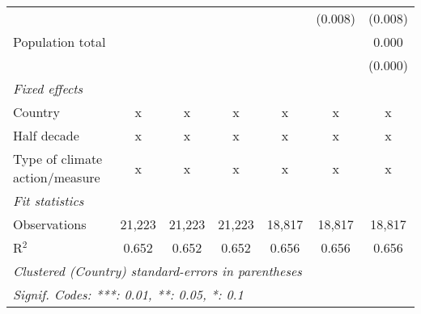 \begin{tabular}{lcccccc}
                                                             &         &                &                &               & (0.008)       & (0.008)\\   
   Population total                                          &         &                &                &               &               & 0.000\\   
                                                             &         &                &                &               &               & (0.000)\\   
   \emph{Fixed effects}\\
   Country                                                   & x       & x              & x              & x             & x             & x\\  
   Half decade                                               & x       & x              & x              & x             & x             & x\\  
   Type of climate action/measure                            & x       & x              & x              & x             & x             & x\\  
   \midrule \emph{Fit statistics}\\
   Observations                                              & 21,223  & 21,223         & 21,223         & 18,817        & 18,817        & 18,817\\  
   R$^2$                                                     & 0.652   & 0.652          & 0.652          & 0.656         & 0.656         & 0.656\\  
   \midrule
   \multicolumn{7}{l}{\emph{Clustered (Country) standard-errors in parentheses}}\\
   \multicolumn{7}{l}{\emph{Signif. Codes: ***: 0.01, **: 0.05, *: 0.1}}\\
\end{tabular}
\par\endgroup


